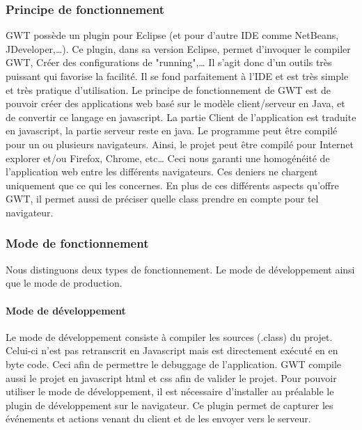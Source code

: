 \subsubsection{Principe de fonctionnement}
GWT possède un plugin pour Eclipse (et pour d'autre IDE comme NetBeans, JDeveloper,…). Ce plugin, dans sa version Eclipse, permet d'invoquer le compiler GWT, Créer des configurations de "running",… Il s'agit donc d'un outils très puissant qui favorise la facilité. Il se fond parfaitement à l'IDE et est très simple et très pratique d'utilisation.
Le principe de fonctionnement de GWT est de pouvoir créer des applications web basé sur le modèle client/serveur en Java, et de convertir ce langage en javascript. La partie Client de l'application est traduite en javascript, la partie serveur reste en java. Le programme peut être compilé pour un ou plusieurs navigateurs. Ainsi, le projet peut être compilé pour Internet explorer et/ou Firefox, Chrome, etc… Ceci nous garanti une homogénéité de l'application web entre les différents navigateurs. Ces deniers ne chargent uniquement que ce qui les concernes. En plus de ces différents aspects qu'offre GWT, il permet aussi de préciser quelle class prendre en compte pour tel navigateur.

\subsubsection{Mode de fonctionnement}
Nous distinguons deux types de fonctionnement. Le mode de développement ainsi que le mode de production.
	
\paragraph{Mode de développement}
Le mode de développement consiste à compiler les sources (.class) du projet. Celui-ci n'est pas retranscrit en Javascript mais est directement exécuté en en byte code. Ceci afin de permettre le debuggage de l'application. GWT compile aussi le projet en javascript html et css afin de valider le projet.
Pour pouvoir utiliser le mode de développement, il est nécessaire d'installer au préalable le plugin de développement sur le navigateur. Ce plugin permet de capturer les événements et actions venant du client et de les envoyer vers le serveur.
